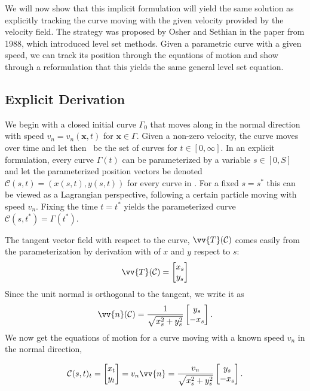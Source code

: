 We will now show that this implicit formulation will yield the same solution as explicitly tracking the curve moving with the given velocity provided by the velocity field. The strategy was proposed by Osher and Sethian in the paper from 1988, which introduced level set methods. Given a parametric curve with a given speed, we can track its position through the equations of motion and show through a reformulation that this yields the same general level set equation.

\subsection{Explicit Derivation} 
We begin with a closed initial curve $\Gamma_0$ that moves along in the normal direction with speed $v_n=v_n(\mathbf{x}, t)$ for $\mathbf{x}\in \Gamma$. Given a non-zero velocity, the curve moves over time and let then \curve\ be the set of curves for $t\in[0, \infty]$. In an explicit formulation, every curve $\Gamma(t)$ can be parameterized by a variable $s\in[0, S]$ and let the parameterized position vectors be denoted $\mathcal{C}(s, t) = (x(s, t), y(s, t))$ for every curve in \curve. For a fixed $s=s^*$ this can be viewed as a Lagrangian perspective, following a certain particle moving with speed $v_n$. Fixing the time $t=t^*$ yields the parameterized curve $\mathcal{C}(s, t^*) = \Gamma(t^*)$.

The tangent vector field with respect to the curve, $\vv{T}(\mathcal{C})$ comes easily from the parameterization by derivation with of $x$ and $y$ respect to $s$:
\begin{equation*}
    \vv{T}(\mathcal{C}) =  \begin{bmatrix}x_s \\ y_s \end{bmatrix}
\end{equation*}
Since the unit normal is orthogonal to the tangent, we write it as
\begin{equation}
    \vv{n}(\mathcal{C}) = \frac{1}{\sqrt{x_s^2+y_s^2}}\begin{bmatrix}y_s \\ -x_s \end{bmatrix}.
    \label{eq:parametric-normal}
\end{equation}
We now get the equations of motion for a curve moving with a known speed $v_n$ in the normal direction,

\begin{equation}
    \mathcal{C}(s, t)_t = \begin{bmatrix}x_t \\ y_t \end{bmatrix} = v_n \vv{n} = \frac{v_n}{\sqrt{x_s^2+y_s^2}}\begin{bmatrix}y_s \\ -x_s \end{bmatrix}.
    \label{eq:parametric-motion-equations}
\end{equation}

